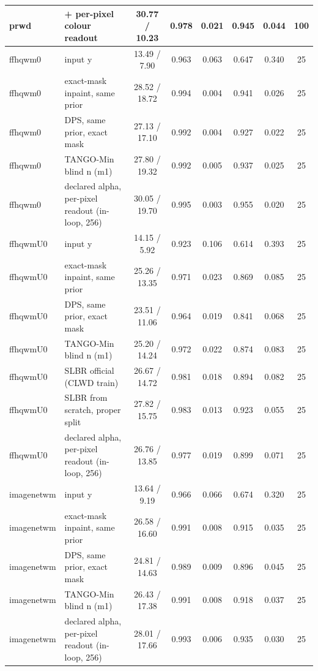 \begin{tabular}{llcccccc}
prwd & + per-pixel colour readout & 30.77 / 10.23 & 0.978 & 0.021 & 0.945 & 0.044 & 100\\
\midrule
ffhqwm0 & input y & 13.49 / 7.90 & 0.963 & 0.063 & 0.647 & 0.340 & 25\\
ffhqwm0 & exact-mask inpaint, same prior & 28.52 / 18.72 & 0.994 & 0.004 & 0.941 & 0.026 & 25\\
ffhqwm0 & DPS, same prior, exact mask & 27.13 / 17.10 & 0.992 & 0.004 & 0.927 & 0.022 & 25\\
ffhqwm0 & TANGO-Min blind n (m1) & 27.80 / 19.32 & 0.992 & 0.005 & 0.937 & 0.025 & 25\\
ffhqwm0 & declared alpha, per-pixel readout (in-loop, 256) & 30.05 / 19.70 & 0.995 & 0.003 & 0.955 & 0.020 & 25\\
\midrule
ffhqwmU0 & input y & 14.15 / 5.92 & 0.923 & 0.106 & 0.614 & 0.393 & 25\\
ffhqwmU0 & exact-mask inpaint, same prior & 25.26 / 13.35 & 0.971 & 0.023 & 0.869 & 0.085 & 25\\
ffhqwmU0 & DPS, same prior, exact mask & 23.51 / 11.06 & 0.964 & 0.019 & 0.841 & 0.068 & 25\\
ffhqwmU0 & TANGO-Min blind n (m1) & 25.20 / 14.24 & 0.972 & 0.022 & 0.874 & 0.083 & 25\\
ffhqwmU0 & SLBR official (CLWD train) & 26.67 / 14.72 & 0.981 & 0.018 & 0.894 & 0.082 & 25\\
ffhqwmU0 & SLBR from scratch, proper split & 27.82 / 15.75 & 0.983 & 0.013 & 0.923 & 0.055 & 25\\
ffhqwmU0 & declared alpha, per-pixel readout (in-loop, 256) & 26.76 / 13.85 & 0.977 & 0.019 & 0.899 & 0.071 & 25\\
\midrule
imagenetwm & input y & 13.64 / 9.19 & 0.966 & 0.066 & 0.674 & 0.320 & 25\\
imagenetwm & exact-mask inpaint, same prior & 26.58 / 16.60 & 0.991 & 0.008 & 0.915 & 0.035 & 25\\
imagenetwm & DPS, same prior, exact mask & 24.81 / 14.63 & 0.989 & 0.009 & 0.896 & 0.045 & 25\\
imagenetwm & TANGO-Min blind n (m1) & 26.43 / 17.38 & 0.991 & 0.008 & 0.918 & 0.037 & 25\\
imagenetwm & declared alpha, per-pixel readout (in-loop, 256) & 28.01 / 17.66 & 0.993 & 0.006 & 0.935 & 0.030 & 25\\
\bottomrule
\end{tabular}

